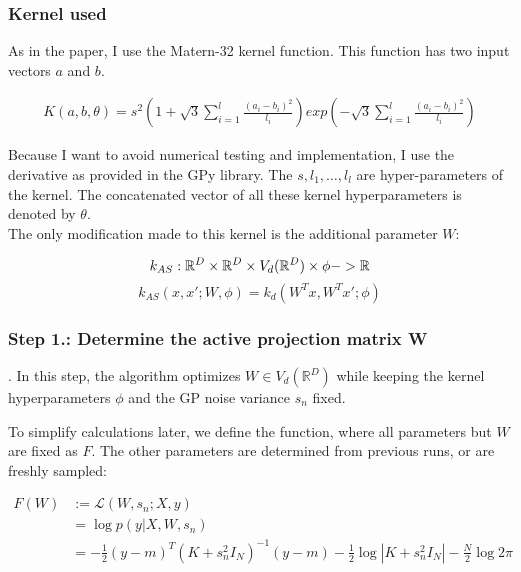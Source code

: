 \subsubsection{Kernel used}
As in the paper, I use the Matern-32 kernel function.
This function has two input vectors $a$ and $b$.

\begin{align}
K(a,  b, \theta) = s^2 \left( 1 + \sqrt{3} \sum_{i=1}^l \frac{(a_i - b_i)^2}{ \textit{l}_i} \right) exp\left( - \sqrt{3} \sum_{i=1}^l \frac{(a_i - b_i)^2}{ \textit{l}_i} \right)
\end{align}

Because I want to avoid numerical testing and implementation, I use the derivative as provided in the GPy library.
The $s, l_1, \ldots, l_l $ are hyper-parameters of the kernel. 
The concatenated vector of all these kernel hyperparameters is denoted by $\theta$. \\

The only modification made to this kernel is the additional parameter $W$:

\begin{equation}
k_{AS} : \mathbb{R}^D \times \mathbb{R}^D \times V_d(\mathbb{R}^D) \times \phi -> \mathbb{R} \\
\end{equation}
\begin{equation}
k_{AS} (x, x'; W, \phi) = k_d(W^T x, W^T x'; \phi)
\end{equation}


\subsubsection{Step 1.: Determine the active projection matrix W}.
In this step, the algorithm optimizes $W \in V_d(\mathbb{R}^D)$ while keeping the kernel hyperparameters $\phi$ and the GP noise variance $s_n$ fixed.

To simplify calculations later, we define the function, where all parameters but $W$ are fixed as $F$. 
The other parameters are determined from previous runs, or are freshly sampled:

\begin{align}
F(W) &:= \mathcal{L}(W, s_n; X, y) \\
& = \log p(y | X, W, s_n) \\
& =  -\frac{1}{2} (y - m)^T (K + s_n^2 I_N)^{-1} (y - m) -\frac{1}{2} \log|K + s_n^2 I_N| -\frac{N}{2} \log 2 \pi   \\
\end{align}

